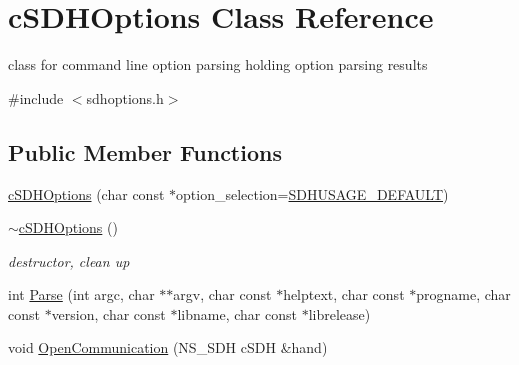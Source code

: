 \hypertarget{classcSDHOptions}{\section{c\-S\-D\-H\-Options \-Class \-Reference}
\label{classcSDHOptions}
}


class for command line option parsing holding option parsing results  




{\ttfamily \#include $<$sdhoptions.\-h$>$}

\subsection*{\-Public \-Member \-Functions}
\begin{DoxyCompactItemize}
\item 
\hyperlink{classcSDHOptions_a855dc504f792a70672dc6e6ce284beac}{c\-S\-D\-H\-Options} (char const $\ast$option\-\_\-selection=\hyperlink{sdhoptions_8h_a90372ef85e86e456fa18741a81f9b81d}{\-S\-D\-H\-U\-S\-A\-G\-E\-\_\-\-D\-E\-F\-A\-U\-L\-T})
\item 
\hyperlink{classcSDHOptions_af6ed7e84c211b5094b2d9c0d18f8a9f7}{$\sim$c\-S\-D\-H\-Options} ()
\begin{DoxyCompactList}\small\item\em destructor, clean up \end{DoxyCompactList}\item 
int \hyperlink{classcSDHOptions_a5424fed1754caa395e0db9638c92323a}{\-Parse} (int argc, char $\ast$$\ast$argv, char const $\ast$helptext, char const $\ast$progname, char const $\ast$version, char const $\ast$libname, char const $\ast$librelease)
\item 
void \hyperlink{classcSDHOptions_a01770c064f4dfe639ad443e8e44c7fb7}{\-Open\-Communication} (\-N\-S\-\_\-\-S\-D\-H c\-S\-D\-H \&hand)
\end{DoxyCompactItemize}
